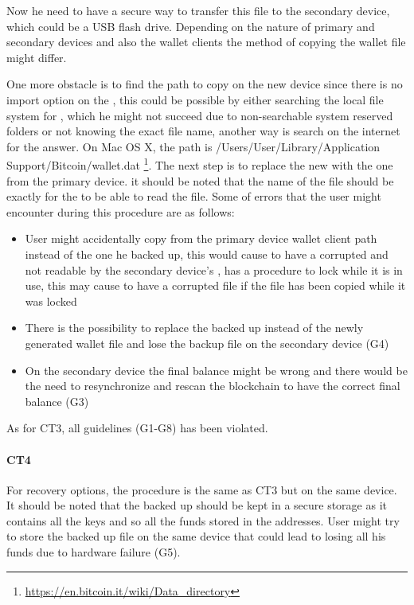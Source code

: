 Now he need to have a secure way to transfer this file to the secondary device, which could be a USB flash drive. Depending on the nature of primary and secondary devices and also the wallet clients the method of copying the wallet file might differ. %

One more obstacle is to find the path to copy \walletfile on the new device since there is no import option on the \bitcoinclient, this could be possible by either searching the local file system for \walletfile, which he might not succeed due to non-searchable system reserved folders or not knowing the exact file name, another way is search on the internet for the answer. On Mac OS X, the path is /Users/User/Library/Application Support/Bitcoin/wallet.dat \footnote{\url{https://en.bitcoin.it/wiki/Data_directory}}. The next step is to replace the new \walletfile with the one from the primary device. it should be noted that the name of the file should be exactly \walletfile for the \bitcoinclient to be able to read the file. Some of errors that the user might encounter during this procedure are as follows:
\begin{itemize}
	\item User might accidentally copy \walletfile from the primary device wallet client path instead of the one he backed up, this would cause to have a corrupted \walletfile and not readable by the secondary device's \bitcoinclient, \bitcoinclient has a procedure to lock \walletfile while it is in use, this may cause to have a corrupted file if the file has been copied while it was locked %
	\item There is the possibility to replace the backed up \walletfile instead of the newly generated wallet file and lose the backup file on the secondary device (G4)
	\item On the secondary device the final balance might be wrong and there would be the need to resynchronize and rescan the blockchain to have the correct final balance (G3)
\end{itemize}
As for CT3, all guidelines (G1-G8) has been violated.\

\paragraph{CT4} For recovery options, the procedure is the same as CT3 but on the same device. It should be noted that the backed up \walletfile should be kept in a secure storage %
as it contains all the keys and so all the funds stored in the addresses. User might try to store the backed up file on the same device that could lead to losing all his funds due to hardware failure (G5).

